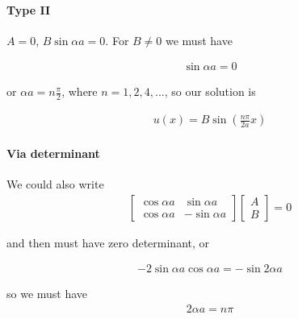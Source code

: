 {\paragraph{Type II}
\(A=0\), \(B \sin\alpha a = 0\).  For \(B \ne 0\) we must have

\begin{equation}\label{eqn:lecture9boundStates:140}
\begin{aligned}
\sin \alpha a = 0
\end{aligned}
\end{equation}

or \(\alpha a = n \frac{\pi}{2}\), where \(n = 1, 2, 4, ...\), so our solution is

\begin{equation}\label{eqn:PHY356Lecture9:10}
\begin{aligned}
u(x) = B \sin \left( \frac{n \pi}{2 a} x \right)
\end{aligned}
\end{equation}

\paragraph{Via determinant}

We could also write
\begin{equation}\label{eqn:lecture9boundStates:160}
\begin{aligned}
\begin{bmatrix}
\cos \alpha a & \sin\alpha a \\
\cos \alpha a & - \sin\alpha a
\end{bmatrix}
\begin{bmatrix}
A \\
B
\end{bmatrix}
= 0
\end{aligned}
\end{equation}

and then must have zero determinant, or

\begin{equation}\label{eqn:PHY356Lecture9:11}
\begin{aligned}
-2 \sin\alpha a \cos\alpha a = -\sin 2 \alpha a
\end{aligned}
\end{equation}

so we must have
\begin{equation}\label{eqn:lecture9boundStates:180}
\begin{aligned}
2 \alpha a = n \pi
\end{aligned}
\end{equation}

}
